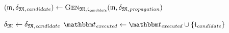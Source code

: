 \begin{algorithmic}[1]
        \State $(\modeltuple{m},\changetuple{\metamodeltuple{M},\mathvariable{candidate}}) \gets \generalizationfunction{\metamodeltuple{M}, \provalgcandidate}(\modeltuple{m}, \changetuple{\metamodeltuple{M},\mathvariable{propagation}})$ \label{algo:orchestration:provenance:line:second_execution}
            \State \Return{$\bot$} \label{algo:orchestration:provenance:line:bot_second_execution}
        \EndIf
        \algblockskip

         \label{algo:orchestration:provenance:line:bot_failcheck}
            \State \Return{$\bot$} \label{algo:orchestration:provenance:line:bot_nonreactiveconverging}
        \EndIf
        \algblockskip
        
        \State $\changetuple{\metamodeltuple{M}} \gets \changetuple{\metamodeltuple{M},\mathvariable{candidate}}$
        \State $\provalgexecuted \gets \provalgexecuted \cup \setted{\provalgcandidate}$ \label{algo:orchestration:provenance:line:executed_update}
        \algindentskip
    \EndFor
    \algblockskip

    \State {}
    \algindentskip
\EndProcedure

\end{algorithmic}
